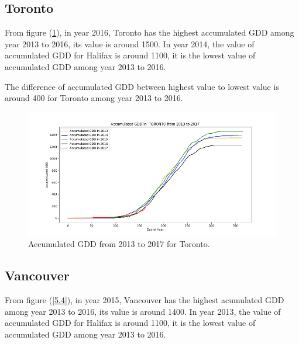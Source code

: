 \documentclass[12pt]{article}
\begin{document}
\subsection{Toronto}

From figure (\ref{5.3}), in year 2016, Toronto has the highest accumulated GDD among year 2013 to 2016, its value is around 1500. In year 2014, the value of accumulated GDD for Halifax is around 1100, it is the lowest value of accumulated GDD among year 2013 to 2016. 

The difference of accumulated GDD between highest value to lowest value is around 400 for Toronto among year 2013 to 2016.

\begin{center}
\begin{figure}[H]
\includegraphics[width=5.25in]{Plot/yearto.png}
\caption{Accumulated GDD from 2013 to 2017 for Toronto.}
\label{5.3}
\end{figure}
\end{center}


\subsection{Vancouver}


From figure (\ref{5.4}), in year 2015, Vancouver has the highest acumulated GDD among year 2013 to 2016, its value is around 1400. In year 2013, the value of accumulated GDD for Halifax is around 1100, it is the lowest value of accumulated GDD among year 2013 to 2016. 
\end{document}
